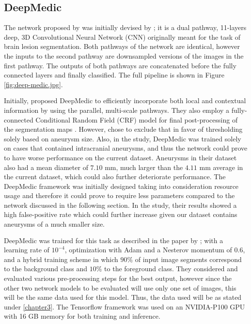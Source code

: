 \subsection{DeepMedic}
The network proposed by \citeauthor{Sichermann2019} was initially devised by \citeauthor{Kamnitsas2017}; it is a dual pathway, 11-layers deep, 3D Convolutional Neural Network (CNN) originally meant for the task of brain lesion segmentation. Both pathways of the network are identical, however the inputs to the second pathway are downsampled versions of the images in the first pathway. The outputs of both pathways are concatenated before the fully connected layers and finally classified. The full pipeline is shown in Figure \ref{fig:deep-medic.jpg}.


Initially, \citeauthor{Kamnitsas2017} proposed DeepMedic to efficiently incorporate both local and contextual information by using the parallel, multi-scale pathways. They also employ a fully-connected Conditional Random Field (CRF) model for final post-processing of the segmentation maps \cite{Krahenbuhl2012}. However, \citeauthor{Sichermann2019} chose to exclude that in favor of thresholding solely based on aneurysm size. Also, in the study, DeepMedic was trained solely on cases that contained intracranial aneurysms, and thus the network could prove to have worse performance on the current dataset. Aneurysms in their dataset also had a mean diameter of $7.10$ mm, much larger than the $4.11$ mm average in the current dataset, which could also further deteriorate performance. The DeepMedic framework was initially designed taking into consideration resource usage and therefore it could prove to require less parameters compared to the network discussed in the following section. In the study, their results showed a high false-positive rate which could further increase given our dataset contains aneurysms of a much smaller size.

DeepMedic was trained for this task as described in the paper by \citeauthor{Sichermann2019}; with a learning rate of $10^{-4}$, optimization with Adam and a Nesterov momentum of $0.6$, and a hybrid training scheme in which $90\%$ of input image segments correspond to the background class and $10\%$ to the foreground class. They considered and evaluated various pre-processing steps for the best output, however since the other two network models to be evaluated will use only one set of images, this will be the same data used for this model. Thus, the data used will be as stated under \ref{chapter3}. The Tensorflow framework was used on an NVIDIA-P100 GPU with 16 GB memory for both training and inference. 

